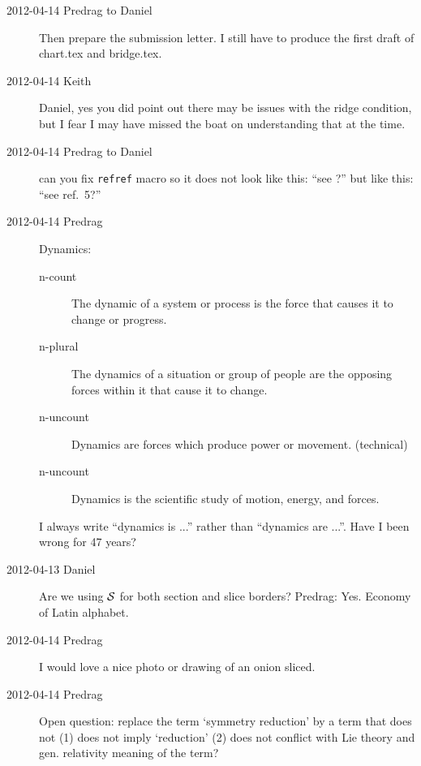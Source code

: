 \begin{description}
\item[2012-04-14 Predrag to Daniel] Then prepare the submission letter. I
still have to produce the first draft of chart.tex and bridge.tex.

\item[2012-04-14 Keith] Daniel, yes you did point out there may be issues
with the ridge condition, but I fear I may have missed the boat on
understanding that at the time.

\item[2012-04-14 Predrag to Daniel] can you fix \texttt{refref} macro so
it does not look like this:
``see ?''
but like this: ``see ref.~5?''

\item[2012-04-14 Predrag]       \toCB
{}
{Dynamics}:

\begin{description}
\item[n-count]  The dynamic of a system or process is the force that
                causes it to change or progress.
\item[n-plural] The dynamics of a situation or group of people are the
                opposing forces within it that cause it to change.
\item[n-uncount]  Dynamics are forces which produce power or movement.    (technical)
\item[n-uncount]  Dynamics is the scientific study of motion, energy, and forces.
\end{description}

I always write ``dynamics is ...'' rather than ``dynamics are ...''. Have I been wrong for 47 years?

\item[2012-04-13 Daniel]
Are we using $\cal{S}$ for both section and slice borders? Predrag: Yes. Economy of Latin alphabet.

\item[2012-04-14  Predrag]
I would love a nice photo or drawing of an onion sliced.

\item[2012-04-14 Predrag]       \toCB
Open question: replace the term `symmetry reduction' by a term that does not
    (1) does not imply `reduction' (2) does not conflict with Lie theory
    and gen. relativity meaning of the term?


\end{description}
